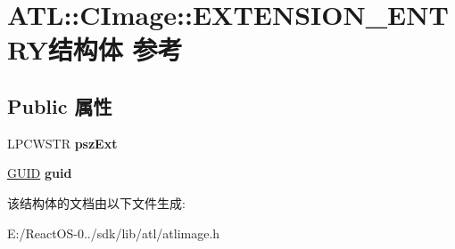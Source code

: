 \hypertarget{struct_a_t_l_1_1_c_image_1_1_e_x_t_e_n_s_i_o_n___e_n_t_r_y}{}\section{A\+TL\+:\+:C\+Image\+:\+:E\+X\+T\+E\+N\+S\+I\+O\+N\+\_\+\+E\+N\+T\+R\+Y结构体 参考}
\label{struct_a_t_l_1_1_c_image_1_1_e_x_t_e_n_s_i_o_n___e_n_t_r_y}
\subsection*{Public 属性}
\begin{DoxyCompactItemize}
\item 
\mbox{\label{struct_a_t_l_1_1_c_image_1_1_e_x_t_e_n_s_i_o_n___e_n_t_r_y_a13b7420831fd4ef77038944aca83230e}} 
L\+P\+C\+W\+S\+TR {\bfseries psz\+Ext}
\item 
\mbox{\label{struct_a_t_l_1_1_c_image_1_1_e_x_t_e_n_s_i_o_n___e_n_t_r_y_aa1ebedfb670ba49e089e941fc9b419cb}} 
\hyperlink{interface_g_u_i_d}{G\+U\+ID} {\bfseries guid}
\end{DoxyCompactItemize}


该结构体的文档由以下文件生成\+:\begin{DoxyCompactItemize}
\item 
E\+:/\+React\+O\+S-\/0../sdk/lib/atl/atlimage.\+h\end{DoxyCompactItemize}
